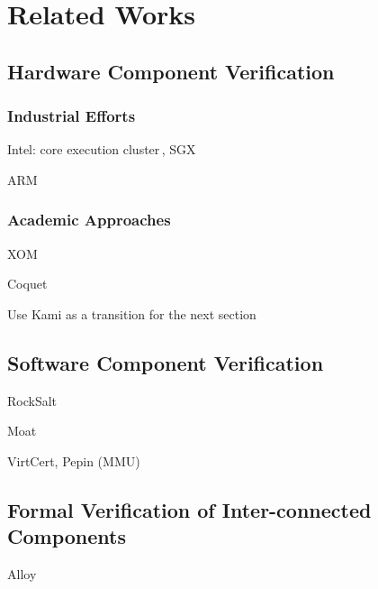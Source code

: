 \chapter{Related Works}
\label{chapter:relatedwork}

\section{Hardware Component Verification} %

\subsection{Industrial Efforts} %

\begin{compactitem}
\item Intel: core execution cluster\,\cite{kaivola2009formalintel},
  SGX\,\cite{leslie2015sgx}
\item ARM\,\cite{fox2010armv7,reid2016armv8}
\end{compactitem}

\subsection{Academic Approaches} %

\begin{compactitem}
\item XOM\,\cite{lie2003xom}
\item Coquet
\item Use Kami as a transition for the next section
\end{compactitem}

\section{Software Component Verification} %

\begin{compactitem}
\item RockSalt
\item Moat
\item VirtCert, Pepin (MMU)
\end{compactitem}

\section{Formal Verification of Inter-connected Components} %

\begin{compactitem}
\item Alloy
\end{compactitem}